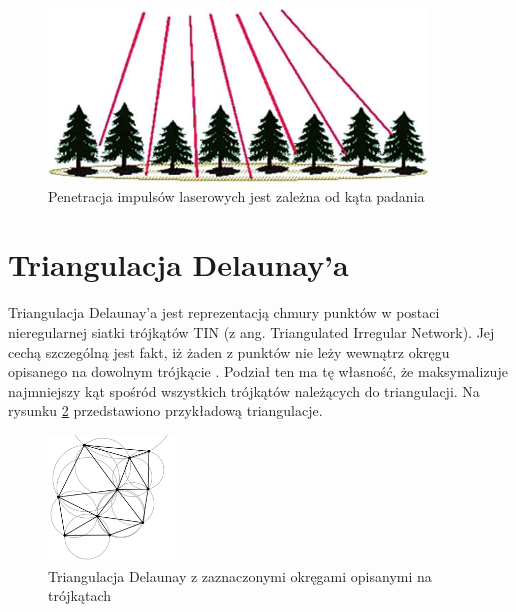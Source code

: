 \begin{figure}[h!]
    \centering
    \includegraphics[width=0.9\textwidth]{img/lidar_tree.png}
    \caption{Penetracja impulsów laserowych jest zależna od kąta padania}
    \label{fig:lidar_tree}
\end{figure}


\section{Triangulacja Delaunay'a}

Triangulacja Delaunay'a jest reprezentacją chmury punktów w postaci nieregularnej siatki trójkątów TIN (z ang. Triangulated Irregular Network).
Jej cechą szczególną jest fakt, iż żaden z punktów nie leży wewnątrz okręgu opisanego na dowolnym trójkącie \cite{Lee1980}. Podział ten ma tę własność, że maksymalizuje najmniejszy kąt spośród 
wszystkich trójkątów należących do triangulacji. Na rysunku \ref{fig:triangulacja} przedstawiono przykładową triangulacje.

\begin{figure}[h!]
    \centering
    \includegraphics[width=0.3\textwidth]{img/triangulacja.jpg}
    \caption{Triangulacja Delaunay z zaznaczonymi okręgami opisanymi na trójkątach}
    \label{fig:triangulacja}
\end{figure}

